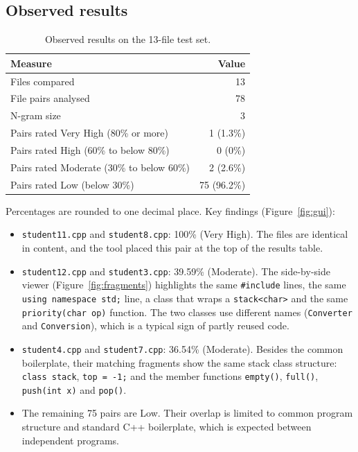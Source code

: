 \documentclass[12pt,a4paper,oneside]{book}
\begin{document}
\subsection{Observed results}
\begin{table}[H]
\centering
\begin{tabular}{@{}lr@{}}
\toprule
Measure & Value \\
\midrule
Files compared & 13 \\
File pairs analysed & 78 \\
N-gram size & 3 \\
Pairs rated Very High (80\% or more) & 1 (1.3\%) \\
Pairs rated High (60\% to below 80\%) & 0 (0\%) \\
Pairs rated Moderate (30\% to below 60\%) & 2 (2.6\%) \\
Pairs rated Low (below 30\%) & 75 (96.2\%) \\
\bottomrule
\end{tabular}
\caption{Observed results on the 13-file test set.}
\label{tab:results}
\end{table}

Percentages are rounded to one decimal place. Key findings (Figure~\ref{fig:gui}):
\begin{itemize}
  \item \texttt{student11.cpp} and \texttt{student8.cpp}: 100\% (Very High). The files are identical in content, and the tool placed this pair at the top of the results table.
  \item \texttt{student12.cpp} and \texttt{student3.cpp}: 39.59\% (Moderate). The side-by-side viewer (Figure~\ref{fig:fragments}) highlights the same \texttt{\#include} lines, the same \texttt{using namespace std;} line, a class that wraps a \texttt{stack<char>} and the same \texttt{priority(char op)} function. The two classes use different names (\texttt{Converter} and \texttt{Conversion}), which is a typical sign of partly reused code.
  \item \texttt{student4.cpp} and \texttt{student7.cpp}: 36.54\% (Moderate). Besides the common boilerplate, their matching fragments show the same stack class structure: \texttt{class stack}, \texttt{top = -1;} and the member functions \texttt{empty()}, \texttt{full()}, \texttt{push(int x)} and \texttt{pop()}.
  \item The remaining 75 pairs are Low. Their overlap is limited to common program structure and standard C++ boilerplate, which is expected between independent programs.
\end{itemize}
\end{document}
